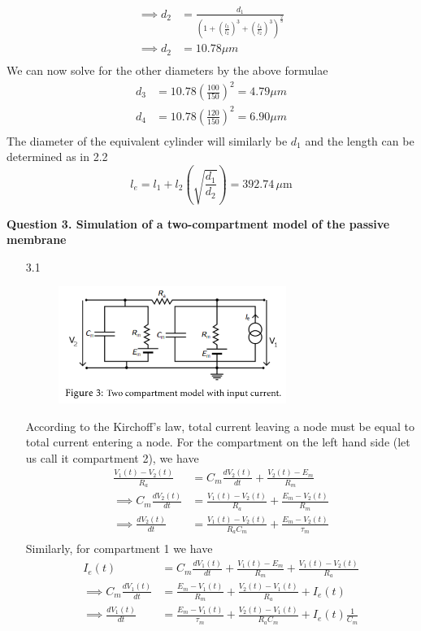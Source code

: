 \documentclass[12pt]{article}
\begin{document}
\begin{enumerate}
\begin{align*}
        \implies d_{2} &= \frac{d_{1}}{\left(1 + \left(\frac{l_{3}}{l_{2}}\right)^{3} + \left(\frac{l_{4}}{l_{2}}\right)^{3}\right)^{\frac{2}{3}}}\\
        \implies d_{2} &= 10.78 \mu m\\
    \end{align*}
    We can now solve for the other diameters by the above formulae
    \begin{align*}
        d_{3} &= 10.78\left(\frac{100}{150}\right)^{2} = 4.79 \mu m\\
        d_{4} &= 10.78\left(\frac{120}{150}\right)^{2} = 6.90 \mu m\\
    \end{align*}
    The diameter of the equivalent cylinder will similarly be $d_{1}$ and the length can be determined as in 2.2
    $$l_{e} = l_{1} + l_{2}\left(\sqrt{\frac{d_{1}}{d_{2}}}\right) = 392.74 \, \mu \text{m}$$
\end{enumerate}

\noindent\textbf{Question 3. Simulation of a two-compartment model of the passive membrane}
\begin{enumerate}
\item[3.1]
\begin{figure}[h]
    \centering
    \includegraphics[width=0.7\textwidth]{circuit.png}
\end{figure}
According to the Kirchoff's law, total current leaving a node must be equal to total current entering a node. For the compartment 
on the left hand side (let us call it compartment 2), we have 
\begin{align*}
    \frac{V_{1}(t) - V_{2}(t)}{R_{a}} &= C_{m}\frac{dV_{2}(t)}{dt} + \frac{V_{2}(t)-E_{m}}{R_m}\\
    \implies C_{m}\frac{dV_{2}(t)}{dt} &= \frac{V_{1}(t) - V_{2}(t)}{R_{a}} + \frac{E_{m} - V_{2}(t)}{R_m}\\
    \implies \frac{dV_{2}(t)}{dt} &= \frac{V_{1}(t) - V_{2}(t)}{R_{a}C_{m}} + \frac{E_{m} - V_{2}(t)}{\tau_{m}}\\
\end{align*}
Similarly, for compartment 1 we have
\begin{align*}
I_{e}(t) &= C_{m}\frac{dV_{1}(t)}{dt} + \frac{V_{1}(t)-E_{m}}{R_m} + \frac{V_{1}(t) - V_{2}(t)}{R_{a}}\\
\implies C_{m}\frac{dV_{1}(t)}{dt} &= \frac{E_{m} - V_{1}(t)}{R_m} + \frac{V_{2}(t) - V_{1}(t)}{R_{a}} + I_{e}(t)\\
\implies \frac{dV_{1}(t)}{dt} &= \frac{E_{m} - V_{1}(t)}{\tau_{m}} + \frac{V_{2}(t) - V_{1}(t)}{R_{a}C_{m}} + I_{e}(t)\frac{1}{C_{m}}\\
\end{align*}
\end{enumerate}
\end{document}
